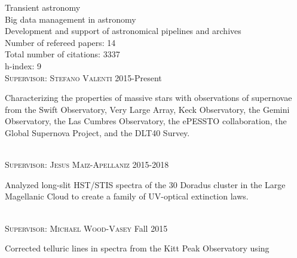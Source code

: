 \documentclass[10pt]{cv}
\begin{document}
\begin{llist}
Transient astronomy\\
Big data management in astronomy\\
Development and support of astronomical pipelines and archives\\ 
\vspace{-0.1in}   
\vspace{-0.1in}   
Number of refereed papers: 14\\
Total number of citations: 3337\\
h-index: 9\\
\vspace{-0.1in}   
\textsc{Supervisor: Stefano Valenti} \hfill 2015-Present\\
\begin{minipage}[l]{0.7\textwidth}\vspace{0.15cm}
Characterizing the properties of massive stars with observations of supernovae from the Swift Observatory, Very Large Array, Keck Observatory, the Gemini Observatory, the Las Cumbres Observatory, the ePESSTO collaboration, the Global Supernova Project, and the DLT40 Survey.\\
\end{minipage}
\\
\textsc{Supervisor: Jesus Maiz-Apellaniz} \hfill 2015-2018\\
\begin{minipage}[l]{0.7\textwidth}\vspace{0.15cm}
Analyzed long-slit HST/STIS spectra of the 30 Doradus cluster in 
the Large Magellanic Cloud to create a family of UV-optical extinction laws. \\
\end{minipage}
\\
\textsc{Supervisor: Michael Wood-Vasey} \hfill Fall 2015\\
\begin{minipage}[l]{0.7\textwidth}\vspace{0.15cm}
Corrected telluric lines in spectra from the Kitt Peak Observatory using

\end{minipage}
\end{llist}
\end{document}
